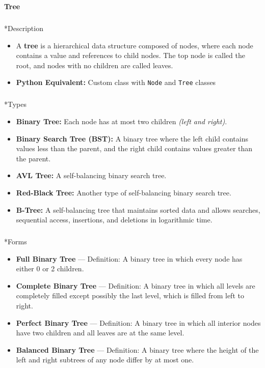\documentclass[
  letterpaper,
  DIV=11,
  numbers=noendperiod]{scrreprt}
\makeatletter
\let\oldsubparagraph\subparagraph
\renewcommand{\subparagraph}{
    \@ifstar
      \xxxSubParagraphStar
      \xxxSubParagraphNoStar
  }
\newcommand{\xxxSubParagraphStar}[1]{\oldsubparagraph*{#1}\mbox{}}
\newcommand{\xxxSubParagraphNoStar}[1]{\oldsubparagraph{#1}\mbox{}}
\providecommand{\tightlist}{%
  \setlength{\itemsep}{0pt}\setlength{\parskip}{0pt}}
\makeatother
\begin{document}
\begin{tcolorbox}[enhanced jigsaw, colframe=quarto-callout-note-color-frame, toprule=.15mm, bottomrule=.15mm, rightrule=.15mm, colback=white, breakable, arc=.35mm, opacityback=0, left=2mm, leftrule=.75mm]

\vspace{-3mm}\textbf{Tree}\vspace{3mm}

\subparagraph*{Description}\label{description-6}

\begin{itemize}
\tightlist
\item
  A \textbf{tree} is a hierarchical data structure composed of nodes,
  where each node contains a value and references to child nodes. The
  top node is called the root, and nodes with no children are called
  leaves.
\item
  \textbf{Python Equivalent:} Custom class with \texttt{Node} and
  \texttt{Tree} classes
\end{itemize}

\subparagraph*{Types}\label{types-1}

\begin{itemize}
\tightlist
\item
  \textbf{Binary Tree:} Each node has at most two children \emph{(left
  and right)}.
\item
  \textbf{Binary Search Tree (BST):} A binary tree where the left child
  contains values less than the parent, and the right child contains
  values greater than the parent.
\item
  \textbf{AVL Tree:} A self-balancing binary search tree.
\item
  \textbf{Red-Black Tree:} Another type of self-balancing binary search
  tree.
\item
  \textbf{B-Tree:} A self-balancing tree that maintains sorted data and
  allows searches, sequential access, insertions, and deletions in
  logarithmic time.
\end{itemize}

\subparagraph*{Forms}\label{forms}

\begin{itemize}
\tightlist
\item
  \textbf{Full Binary Tree} --- Definition: A binary tree in which every
  node has either 0 or 2 children.
\item
  \textbf{Complete Binary Tree} --- Definition: A binary tree in which
  all levels are completely filled except possibly the last level, which
  is filled from left to right.
\item
  \textbf{Perfect Binary Tree} --- Definition: A binary tree in which
  all interior nodes have two children and all leaves are at the same
  level.
\item
  \textbf{Balanced Binary Tree} --- Definition: A binary tree where the
  height of the left and right subtrees of any node differ by at most
  one.
\end{itemize}


\end{tcolorbox}
\end{document}

